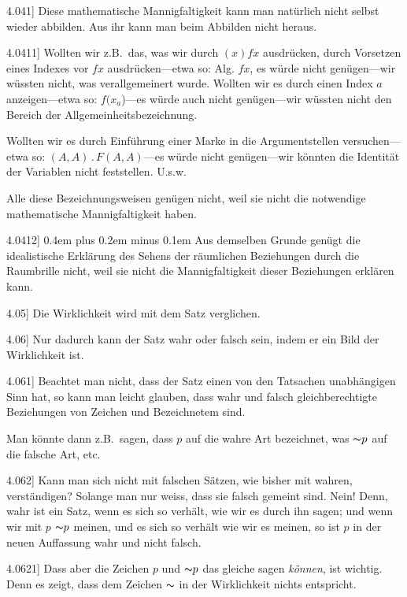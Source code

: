 \documentclass[12pt,oneside]{book}[2007/10/19]
\newcommand{\PropERef}[1]{\hyperref[PropE:#1]{#1}}
\newcommand{\PropositionG}[2]{%
  \item[\phantomsection\label{PropG:#1}\PropERef{#1}] #2%
}
\newcommand{\Not}[1]{\mathord{\thicksim} #1}
\newcommand{\DotOp}{\mathbin{.}}
\newcommand{\Emph}[1]{\emph{#1}}%
\newcommand{\zumBeispiel}{z.\;B.}
\newcommand{\stretchyspace}{\spaceskip0.4em plus 0.2em minus 0.1em}
\begin{document}
\begin{propositions}
\PropositionG{4.041}
{Diese mathematische Mannigfaltigkeit kann
man natürlich nicht selbst wieder abbilden. Aus
ihr kann man beim Abbilden nicht heraus.}


\PropositionG{4.0411}
{Wollten wir \zumBeispiel\ das, was wir durch \glqq{}$(x) fx$\grqq{}
ausdrücken, durch Vorsetzen eines Indexes vor
\glqq{}$fx$\grqq{} ausdrücken---etwa so: \glqq{}Alg. $fx$\grqq{}, es würde
nicht genügen---wir wüssten nicht, was verallgemeinert
wurde. Wollten wir es durch einen
Index \glqq{}$a$\grqq{} anzeigen---etwa so: \glqq{}$f(x_{a}$)\grqq{}---es würde
auch nicht genügen---wir wüssten nicht den
Bereich der Allgemeinheitsbezeichnung.

Wollten wir es durch Einführung einer Marke
in die Argumentstellen ver\-su\-chen---etwa so:
\glqq{}$(A, A) \DotOp F (A, A)$\grqq{}---es würde nicht ge\-nü\-gen---wir
könnten die Identität der Variablen nicht feststellen.
U.s.w.

Alle diese Bezeichnungsweisen genügen nicht,
weil sie nicht die notwendige mathematische
Mannigfaltigkeit haben.}


\PropositionG{4.0412}
{{\stretchyspace
Aus demselben Grunde genügt die idealistische
Erklärung des Sehens der räumlichen Beziehungen
durch die \glqq{}Raumbrille\grqq{} nicht, weil sie nicht die
Mannigfaltigkeit dieser Beziehungen erklären kann.}}


\PropositionG{4.05}
{Die Wirklichkeit wird mit dem Satz verglichen.}


\PropositionG{4.06}
{Nur dadurch kann der Satz wahr oder falsch
sein, indem er ein Bild der Wirklichkeit ist.}


\PropositionG{4.061}
{Beachtet man nicht, dass der Satz einen von
den Tatsachen unabhängigen Sinn hat, so kann
man leicht glauben, dass wahr und falsch gleichberechtigte
Beziehungen von Zeichen und Bezeichnetem
sind.

Man könnte dann \zumBeispiel\ sagen, dass \glqq{}$p$\grqq{} auf die
wahre Art bezeichnet, was \glqq{}$\Not{p}$\grqq{} auf die falsche
Art, etc.}


\PropositionG{4.062}
{Kann man sich nicht mit falschen Sätzen, wie
bisher mit wahren, verständigen? Solange man
nur weiss, dass sie falsch gemeint sind. Nein!
Denn, wahr ist ein Satz, wenn es sich so verhält,
wie wir es durch ihn sagen; und wenn wir mit
\glqq{}$p$\grqq{} $\Not{p}$ meinen, und es sich so verhält wie wir es
meinen, so ist \glqq{}$p$\grqq{} in der neuen Auffassung wahr
und nicht falsch.}


\PropositionG{4.0621}
{Dass aber die Zeichen \glqq{}$p$\grqq{} und \glqq{}$\Not{p}$\grqq{} das gleiche
sagen \Emph{können}, ist wichtig. Denn es zeigt, dass
dem Zeichen \glqq{}$\Not{}$\grqq{} in der Wirklichkeit nichts
entspricht.

}
\end{propositions}
\end{document}
